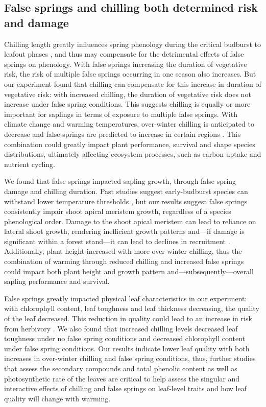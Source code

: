 \documentclass{article}\usepackage[]{graphicx}\usepackage[]{color}
\begin{document}
\subsection*{False springs and chilling both determined risk and damage}
Chilling length greatly influences spring phenology during the critical budburst to leafout phases \citep{Chuine2001, Laube2014}, and thus may compensate for the detrimental effects of false springs on phenology. With false springs increasing the duration of vegetative risk, the risk of multiple false springs occurring in one season also increases. But our experiment found that chilling can compensate for this increase in duration of vegetative risk: with increased chilling, the duration of vegetative risk does not increase under false spring conditions. This suggests chilling is equally or more important for saplings in terms of exposure to multiple false springs. With climate change and warming temperatures, over-winter chilling is anticipated to decrease \citep{Laube2014} and false springs are predicted to increase in certain regions \citep{Ault2015, Liu2018}. This combination could greatly impact plant performance, survival and shape species distributions, ultimately affecting ecosystem processes, such as carbon uptake and nutrient cycling.
 
We found that false springs impacted sapling growth, through false spring damage and chilling duration. Past studies suggest early-budburst species can withstand lower temperature thresholds \citep{Lenz2013, Muffler2016, Zohner2020}, but our results suggest false springs consistently impair shoot apical meristem growth, regardless of a species phenological order. Damage to the shoot apical meristem can lead to reliance on lateral shoot growth, rendering inefficient growth patterns and---if damage is significant within a forest stand---it can lead to declines in recruitment \citep{Rhodes2018}. Additionally, plant height increased with more over-winter chilling, thus the combination of warming through reduced chilling and increased false springs could impact both plant height and growth pattern and---subsequently---overall sapling performance and survival. 
  
False springs greatly impacted physical leaf characteristics in our experiment: with chlorophyll content, leaf toughness and leaf thickness decreasing, the quality of the leaf decreased. This reduction in quality could lead to an increase in risk from herbivory \citep{Onoda2011}. We also found that increased chilling levels decreased leaf toughness under no false spring conditions and decreased chlorophyll content under false spring conditions. Our results indicate lower leaf quality with both increases in over-winter chilling and false spring conditions, thus, further studies that assess the secondary compounds and total phenolic content \citep{Ayres1993, Webber2016} as well as photosynthetic rate of the leaves are critical to help assess the singular and interactive effects of chilling and false springs on leaf-level traits and how leaf quality will change with warming. 
\end{document}
